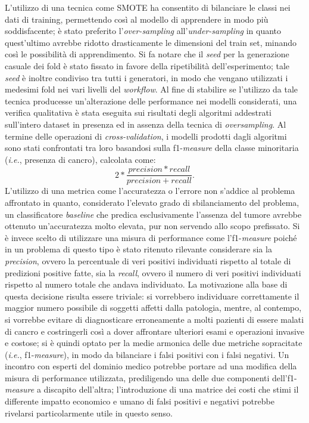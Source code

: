 L'utilizzo di una tecnica come SMOTE ha consentito di bilanciare le classi nei dati di training, permettendo così al modello di apprendere in modo più soddisfacente; è stato preferito l'\textit{over-sampling} all'\textit{under-sampling} in quanto quest'ultimo avrebbe ridotto drasticamente le dimensioni del train set, minando così le possibilità di apprendimento.
Si fa notare che il \textit{seed} per la generazione casuale dei fold è stato fissato in favore della ripetibilità dell'esperimento; tale \textit{seed} è inoltre condiviso tra tutti i generatori, in modo che vengano utilizzati i medesimi fold nei vari livelli del \textit{workflow}.
Al fine di stabilire se l'utilizzo da tale tecnica producesse un'alterazione delle performance nei modelli considerati, una verifica qualitativa è stata eseguita sui risultati degli algoritmi addestrati sull'intero dataset in presenza ed in assenza della tecnica di \textit{oversampling}.
Al termine delle operazioni di \textit{cross-validation}, i modelli prodotti dagli algoritmi sono stati confrontati tra loro basandosi sulla f1-\textit{measure} della classe minoritaria (\textit{i.e.}, presenza di cancro), calcolata come: \[2 * \frac{precision*recall}{precision+recall}.\]
L'utilizzo di una metrica come l'accuratezza o l'errore non s'addice al problema affrontato in quanto, considerato l'elevato grado di sbilanciamento del problema, un classificatore \textit{baseline} che predica esclusivamente l'assenza del tumore avrebbe ottenuto un'accuratezza molto elevata, pur non servendo allo scopo prefissato. 
Si è invece scelto di utilizzare una misura di performance come l'f1-\textit{measure} poiché in un problema di questo tipo è stato ritenuto rilevante considerare sia la \textit{precision}, ovvero la percentuale di veri positivi individuati rispetto al totale di predizioni positive fatte, sia la \textit{recall}, ovvero il numero di veri positivi individuati rispetto al numero totale che andava individuato. 
La motivazione alla base di questa decisione risulta essere triviale: si vorrebbero individuare correttamente il maggior numero possibile di soggetti affetti dalla patologia, mentre, al contempo, si vorrebbe evitare di diagnosticare erroneamente a molti pazienti di essere malati di cancro e costringerli così a dover affrontare ulteriori esami e operazioni invasive e costose; si è quindi optato per la medie armonica delle due metriche sopracitate (\textit{i.e.}, f1-\textit{measure}), in modo da bilanciare i falsi positivi con i falsi negativi.
Un incontro con esperti del dominio medico potrebbe portare ad una modifica della misura di performance utilizzata, prediligendo una delle due componenti dell'f1-\textit{measure} a discapito dell'altra; l'introduzione di una matrice dei costi che stimi il differente impatto economico e umano di falsi positivi e negativi potrebbe rivelarsi particolarmente utile in questo senso.\\
